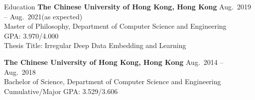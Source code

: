 

\begin{rSection}{Education}
{\bf The Chinese University of Hong Kong, Hong Kong} \hfill {Aug.~2019 -- Aug.~2021(as expected)} \\ 
Master of Philosophy, Department of Computer Science and Engineering \\
GPA: 3.970/4.000 \\
Thesis Title: Irregular Deep Data Embedding and Learning

{\bf The Chinese University of Hong Kong, Hong Kong} \hfill {Aug.~2014 -- Aug.~2018} \\ 
Bachelor of Science, Department of Computer Science and Engineering \\
Cumulative/Major GPA: 3.529/3.606
\end{rSection}




